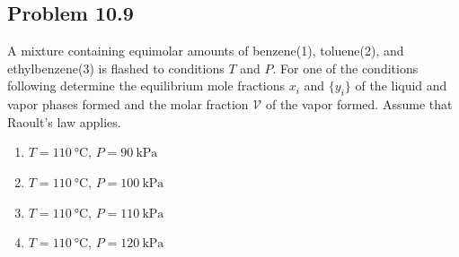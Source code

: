 \documentclass{article}
\begin{document}
\subsection*{Problem 10.9}
A mixture containing equimolar amounts of benzene(1), toluene(2), and
ethylbenzene(3) is flashed to conditions $T$ and $P$. For one of the
conditions following determine the equilibrium mole fractions
{$x_{i}$} and $\{y_{i}\}$ of the liquid and vapor phases formed and
the molar fraction $\mathcal{V}$ of the vapor formed. Assume that
Raoult's law applies.
\begin{enumerate}[label=(\alph*)]
  \item $T=110~\unit{\degreeCelsius}$, $P=90~\unit{\kilo\pascal}$
  \item $T=110~\unit{\degreeCelsius}$, $P=100~\unit{\kilo\pascal}$
  \item $T=110~\unit{\degreeCelsius}$, $P=110~\unit{\kilo\pascal}$
  \item $T=110~\unit{\degreeCelsius}$, $P=120~\unit{\kilo\pascal}$
\end{enumerate}
\end{document}
